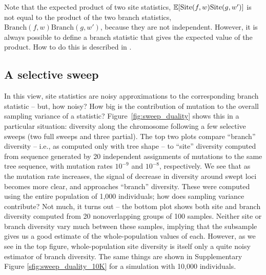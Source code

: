 \documentclass{article}
\newcommand{\branch}{\mbox{Branch}} %
\newcommand{\site}{\mbox{Site}} %
\newcommand{\iw}{w} %
\begin{document}
Note that the expected product of two site statistics,
$\E[\site(f, \iw) \site(g, \iw')]$
is not equal to the product of the two branch statistics, $\branch(f, \iw) \branch(g, \iw')$,
because they are not independent.
However, it is always possible to define a branch statistic that
gives the expected value of the product.
How to do this is described in \citet{ralph2019empirical}.


\subsection*{A selective sweep}

In this view,
site statistics are noisy approximations to the corresponding branch statistic
-- but, how noisy?
How big is the contribution of mutation to the overall sampling variance of a statistic?
Figure~\ref{fig:sweep_duality} shows this in a particular situation:
diversity along the chromosome following a few selective sweeps (two full sweeps and three partial).
The top two plots compare ``branch'' diversity -- i.e., as computed only with tree shape --
to ``site'' diversity computed from sequence generated by 20 independent assignments of mutations to the same tree sequence,
with mutation rates $10^{-9}$ and $10^{-8}$, respectively.
We see that as the mutation rate increases, the signal of decrease in diversity around swept loci becomes more clear,
and approaches ``branch'' diversity.
These were computed using the entire population of 1,000 individuals;
how does sampling variance contribute?
Not much, it turns out -- the bottom plot shows both site and branch diversity
computed from 20 nonoverlapping groups of 100 samples.
Neither site or branch diversity vary much between these samples,
implying that the subsample gives us a good estimate of the whole-population values of each.
However, as we see in the top figure,
whole-population site diversity is itself only a quite noisy estimator of branch diversity.
The same things are shown in Supplementary Figure \ref{sfig:sweep_duality_10K}
for a simulation with 10,000 individuals.
\end{document}
